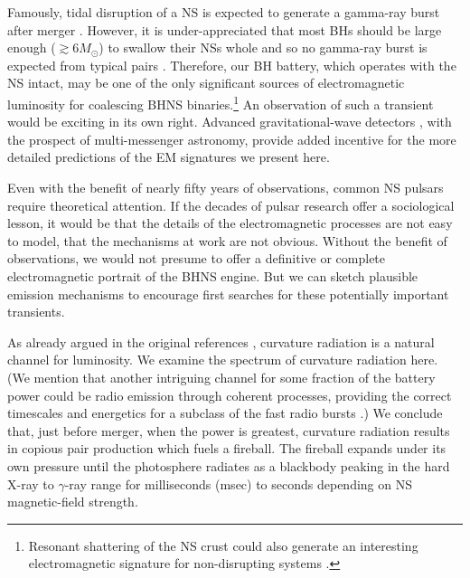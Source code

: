 Famously, tidal disruption of a NS is expected to generate a gamma-ray
burst after merger \citep{NPP:NSBH_GRB:1992}. However, it is
under-appreciated that most BHs should be large enough ($\gtrsim
6M_\odot $) to swallow their NSs whole and so no gamma-ray burst is
expected from typical pairs \citep{Ozel:2010}. Therefore, our BH
battery, which operates with the NS intact, may be one of the only
significant sources of electromagnetic luminosity for coalescing BHNS binaries.\footnote{Resonant shattering of the NS crust could also generate an interesting electromagnetic 
signature for non-disrupting systems \citep{Tsang:2012, Tsang:2013}.}
% 
An observation of such a transient would be exciting in its own right.
Advanced gravitational-wave detectors \citep[{\em
    e.g.},][]{AdLIGO:2010}, with the prospect of multi-messenger
astronomy, provide added incentive for the more detailed predictions
of the EM signatures we present here.

Even with the benefit of nearly fifty years of observations, common NS
pulsars require theoretical attention. If the decades of pulsar
research offer a sociological lesson, it would be that the details of
the electromagnetic processes are not easy to model, that the
mechanisms at work are not obvious. Without the benefit of
observations, we would not presume to offer a definitive or complete
electromagnetic portrait of the BHNS engine. But we can sketch
plausible emission mechanisms to encourage first searches for these
potentially important transients.



As already argued in the original references
\citep{McL:2011,DL:2013}, curvature radiation is a natural
channel for luminosity.  We examine the spectrum of curvature
radiation here.  (We mention that another intriguing channel for some
fraction of the battery power could be radio emission through coherent
processes, providing the correct timescales and energetics for a
subclass of the fast radio bursts \citep{Chiara:2015}.)  We conclude
that, just before merger, when the power is greatest, curvature
radiation results in copious pair production which fuels a
fireball. The fireball expands under its own pressure until the
photosphere radiates as a blackbody peaking in the hard X-ray to
$\gamma$-ray range for milliseconds (msec) to seconds depending on NS
magnetic-field strength.  

